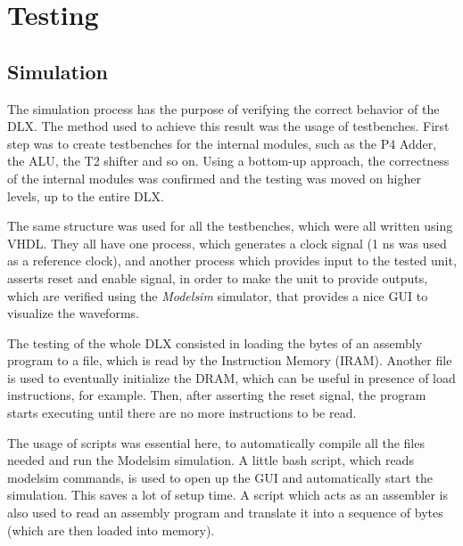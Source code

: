 \chapter{Testing}
\label{Simulation}

\section{Simulation}

The simulation process has the purpose of verifying the correct behavior of the DLX.
The method used to achieve this result was the usage of testbenches.
First step was to create testbenches for the internal modules, such as the P4 Adder, the ALU, the T2 shifter and so on.
Using a bottom-up approach, the correctness of the internal modules was confirmed and the testing was moved on higher levels, up to the entire DLX.

The same structure was used for all the testbenches, which were all written using VHDL.
They all have one process, which generates a clock signal (1 ns was used as a reference clock), and another process which
provides input to the tested unit, asserts reset and enable signal, in order to make the unit to provide outputs, which are verified using the \textit{Modelsim} simulator, that provides
a nice GUI to visualize the waveforms.

The testing of the whole DLX consisted in loading the bytes of an assembly program to a file, which is read by the Instruction Memory (IRAM).
Another file is used to eventually initialize the DRAM, which can be useful in presence of load instructions, for example.
Then, after asserting the reset signal, the program starts executing until there are no more instructions to be read.

The usage of scripts was essential here, to automatically compile all the files needed and run the Modelsim simulation. A little bash script, which reads modelsim commands, is used
to open up the GUI and automatically start the simulation. This saves a lot of setup time.
A script which acts as an assembler is also used to read an assembly program and translate it into a sequence of bytes (which are then loaded into memory).








